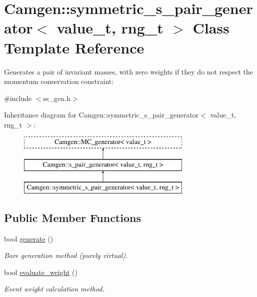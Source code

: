 \hypertarget{a00534}{}\section{Camgen\+:\+:symmetric\+\_\+s\+\_\+pair\+\_\+generator$<$ value\+\_\+t, rng\+\_\+t $>$ Class Template Reference}
\label{a00534}


Generates a pair of invariant masses, with zero weights if they do not respect the momentum conservation constraint\+:  




{\ttfamily \#include $<$ss\+\_\+gen.\+h$>$}

Inheritance diagram for Camgen\+:\+:symmetric\+\_\+s\+\_\+pair\+\_\+generator$<$ value\+\_\+t, rng\+\_\+t $>$\+:\begin{figure}[H]
\begin{center}
\leavevmode
\includegraphics[height=3.000000cm]{a00534}
\end{center}
\end{figure}
\subsection*{Public Member Functions}
\begin{DoxyCompactItemize}
\item 
bool \hyperlink{a00534_a5f259afbf4c7c1f73649bd3775b14517}{generate} ()
\begin{DoxyCompactList}\small\item\em \textquotesingle{}Bare generation\textquotesingle{} method (purely virtual). \end{DoxyCompactList}\item 
\hypertarget{a00534_ad8c122e8f0b816e31e7f2bc951c0a03b}{}bool \hyperlink{a00534_ad8c122e8f0b816e31e7f2bc951c0a03b}{evaluate\+\_\+weight} ()\label{a00534_ad8c122e8f0b816e31e7f2bc951c0a03b}

\begin{DoxyCompactList}\small\item\em Event weight calculation method. \end{DoxyCompactList}\end{DoxyCompactItemize}
